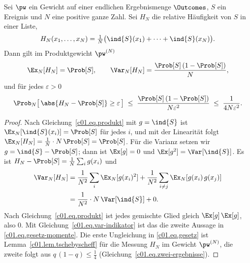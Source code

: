 \begin{vertiefung}
  \begin{theorem}\label{c01.thm.haeufigkeit}
    Sei $\pw$ ein Gewicht auf einer endlichen Ergebnismenge $\Outcomes$, $S$ ein Ereignis
    und $N$ eine positive ganze Zahl. Sei $H_N$ die relative Häufigkeit von $S$ in einer Liste,
    \begin{equation*}
      H_N(x_1, \dots, x_N) = \tfrac{1}{N}\bigl(\ind{S}(x_1) + \dots + \ind{S}(x_N)\bigr) .
    \end{equation*}
    Dann gilt im Produktgewicht $\pw^{(N)}$
    \begin{equation}\label{c01.eq.gesetz-momente}
      \Ex_N[H_N] = \Prob[S],
      \qquad
      \Var_N[H_N] = \frac{\Prob[S]\,(1 - \Prob[S])}{N} ,
    \end{equation}
    und für jedes $\varepsilon > 0$
    \begin{equation}\label{c01.eq.gesetz}
      \Prob_N\bigl[\,\abs{H_N - \Prob[S]} \geq \varepsilon\,\bigr]
      \;\leq\; \frac{\Prob[S]\,(1 - \Prob[S])}{N \varepsilon^2}
      \;\leq\; \frac{1}{4 N \varepsilon^2} .
    \end{equation}
  \end{theorem}
  \begin{proof}
    Nach Gleichung~\eqref{c01.eq.produkt} mit $g = \ind{S}$ ist
    $\Ex_N[\ind{S}(x_i)] = \Prob[S]$ für jedes $i$, und mit der Linearität folgt
    $\Ex_N[H_N] = \tfrac{1}{N}\cdot N\, \Prob[S] = \Prob[S]$. Für die Varianz setzen wir
    $g = \ind{S} - \Prob[S]$; dann ist $\Ex[g] = 0$ und $\Ex[g^2] = \Var[\ind{S}]$. Es ist
    $H_N - \Prob[S] = \tfrac{1}{N}\sum_i g(x_i)$ und
    \begin{equation}\label{c01.eq.gesetz-rechnung}
      \begin{aligned}
        \Var_N[H_N]
        &= \frac{1}{N^2} \sum_{i} \Ex_N[g(x_i)^2]
          + \frac{1}{N^2} \sum_{i \neq j} \Ex_N[g(x_i)\,g(x_j)] \\
        &= \frac{1}{N^2}\cdot N\, \Var[\ind{S}] + 0 .
      \end{aligned}
    \end{equation}
    Nach Gleichung~\eqref{c01.eq.produkt} ist jedes gemischte Glied gleich
    $\Ex[g]\,\Ex[g]$, also $0$. Mit Gleichung~\eqref{c01.eq.var-indikator} ist das die
    zweite Aussage in \eqref{c01.eq.gesetz-momente}. Die erste Ungleichung in
    \eqref{c01.eq.gesetz} ist Lemma~\ref{c01.lem.tschebyscheff} für die Messung $H_N$ im
    Gewicht $\pw^{(N)}$, die zweite folgt aus $q\,(1-q) \leq \tfrac14$
    (Gleichung~\eqref{c01.eq.zwei-ergebnisse}).
  \end{proof}


\end{vertiefung}
